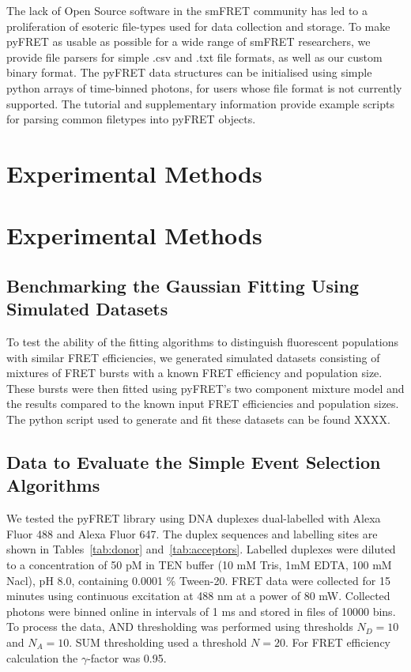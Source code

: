 The lack of Open Source software in the smFRET community has led to a proliferation of esoteric file-types used for data collection and storage. To make pyFRET as usable as possible for a wide range of smFRET researchers, we provide file parsers for simple .csv and .txt file formats, as well as our custom binary format. The pyFRET data structures can be initialised using simple python arrays of time-binned photons, for users whose file format is not currently supported. The tutorial and supplementary information provide example scripts for parsing common filetypes into pyFRET objects.

\section{Experimental Methods}
\section*{Experimental Methods}
\subsection*{Benchmarking the Gaussian Fitting Using Simulated Datasets}
To test the ability of the fitting algorithms to distinguish fluorescent populations with similar FRET efficiencies, we generated simulated datasets consisting of mixtures of FRET bursts with a known FRET efficiency and population size. These bursts were then fitted using pyFRET's two component mixture model and the results compared to the known input FRET efficiencies and population sizes. The python script used to generate and fit these datasets can be found XXXX. 

\subsection*{Data to Evaluate the Simple Event Selection Algorithms}
We tested the pyFRET library using DNA duplexes dual-labelled with Alexa Fluor 488 and Alexa Fluor 647. The duplex sequences and labelling sites are shown in Tables~\ref{tab:donor} and~\ref{tab:acceptors}. Labelled duplexes were diluted to a concentration of 50 pM in TEN buffer (10 mM Tris, 1mM EDTA, 100 mM Nacl), pH 8.0, containing 0.0001 \% Tween-20. FRET data were collected for 15 minutes using continuous excitation at 488 nm at a power of 80 mW. Collected photons were binned online in intervals of 1 ms and stored in files of 10000 bins. To process the data, AND thresholding was performed using thresholds $N_D = 10$ and $N_A = 10$. SUM thresholding used a threshold $N = 20$. For FRET efficiency calculation the $\gamma$-factor was 0.95.

